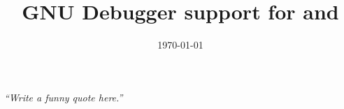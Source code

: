 \documentclass[legalpaper, 11pt, oneside]{Thesis}  %
\begin{document}
\frontmatter      %
\linenumbers    %
\title{GNU Debugger support for \uCPPS and \CFA}
\addresses  {\groupname\\\deptname\\\univname}  %
\date       {\today}
\subject    {}
\keywords   {}
\maketitle


\fancyhead{}  %
\rhead{\thepage}  %
\lhead{}  %

\pagestyle{fancy}  %

\iffalse
\Declaration{

\addtocontents{toc}{\vspace{1em}}  %
\end{itemize}
 
 
Signed:\\
\rule[1em]{25em}{0.5pt}  %
 
Date:\\
\rule[1em]{25em}{0.5pt}  %
}
\clearpage  %
\fi

\iffalse
\pagestyle{empty}  %

\null\vfill
\textit{``Write a funny quote here.''}
\end{document}
